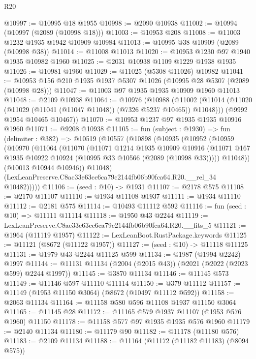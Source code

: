 \begin{lexlean}{R20}
\begin{coremodule}
@10997 := @10995 @18 @1955
@10998 := @2090 @10938
@11002 := @10994 (@10997 (@2089 (@10998 @18)))
@11003 := @10953 @208
@11008 := @11003 @1232 @1935 @1942 @10909 @10984
@11013 := @10995 @38 @10909 (@2089 (@10998 @38))
@11014 := @11008 @11013
@11020 := @10953 @1230 @97 @1940 @1935 @10982 @1960
@11025 := @2031 @10938 @1109 @1229 @1938 @1935
@11026 := @10981 @1960
@11029 := @11025 (@5308 @11026) @10982
@11041 := @10953 @156 @210 @1935 @1937 @5307 @11026 (@10995 @28 @5307 (@2089 (@10998 @28)))
@11047 := @11003 @97 @1935 @1935 @10909 @1960 @11013
@11048 := @2109 @10938
@11064 := @10976
    (@10988
      (@11002 (@11014 (@11020 (@11029 (@11041 (@11047 @11048)) (@7326 @5237 @10465)) @11048)))
      (@9992 @1954 @10465 @10467))
@11070 := @10953 @1237 @97 @1935 @1935 @10916 @1960
@11071 := @9208 @10938
@11105 := fun (subject : @1930) =>
  fun (delimiter : @382) =>
  @10519
    (@10557
      (@10898
        (@10935
          (@10952
            (@10959
              (@10970
                (@11064
                  (@11070
                    (@11071
                      @1214
                      @1935
                      @10909
                      @10916
                      (@11071 @167 @1935 @10922 @10924 (@10995 @33 @10566 (@2089 (@10998 @33)))))
                    @11048))
                (@10013 @10944 @10946))
              @11048)
            (LexLeanPreserve.C8ac33e63cc6ca79c2144fb06b90fca64.R20.__rel_34 @10482)))))
@11106 := (seed : @10) -> @1931
@11107 := @2178 @575
@11108 := @2170 @11107
@11110 := @1934 @11108 @1937
@11111 := @1934 @11110
@11112 := @2181 @575
@11114 := @10493 @11112 @592
@11116 := fun (seed : @10) => @11111 @11114
@11118 := @1950 @43 @2244
@11119 := LexLeanPreserve.C8ac33e63cc6ca79c2144fb06b90fca64.R20.__fits_5
@11121 := @1964 (@11119 @1957)
@11122 := LexLeanBoot.RustPackage.keywords
@11125 := @11121 (@8672 (@11122 @1957))
@11127 := (seed : @10) -> @11118 @11125
@11131 := @1979 @43 @2244 @11125 @599
@11134 := @1987 (@1994 @2242) @1997
@11144 := @11131 @11134 (@2004 (@2015 @43)) (@2021 (@2022 (@2023 @599) @2244 @1997))
@11145 := @3870 @11134
@11146 := @11145 @573
@11149 := @11146 @597 @11110 @11114
@11150 := @379 @11112
@11157 := @11149 (@1953 @11150 @3064) (@8672 (@10497 @11112 @592))
@11158 := @2063 @11134
@11164 := @11158 @580 @596 @11108 @1937 @11150 @3064
@11165 := @11145 @28
@11172 := @11165 @579 @1937 @11107 (@1953 @576 @1960) @11150
@11178 := @11158 @577 @97 @1935 @1935 @576 @1960
@11179 := @2140 @11134
@11180 := @11179 @90
@11182 := @11178 (@11180 @576)
@11183 := @2109 @11134
@11188 := @11164 (@11172 (@11182 @11183) (@8094 @575))

\end{coremodule}
\end{lexlean}
